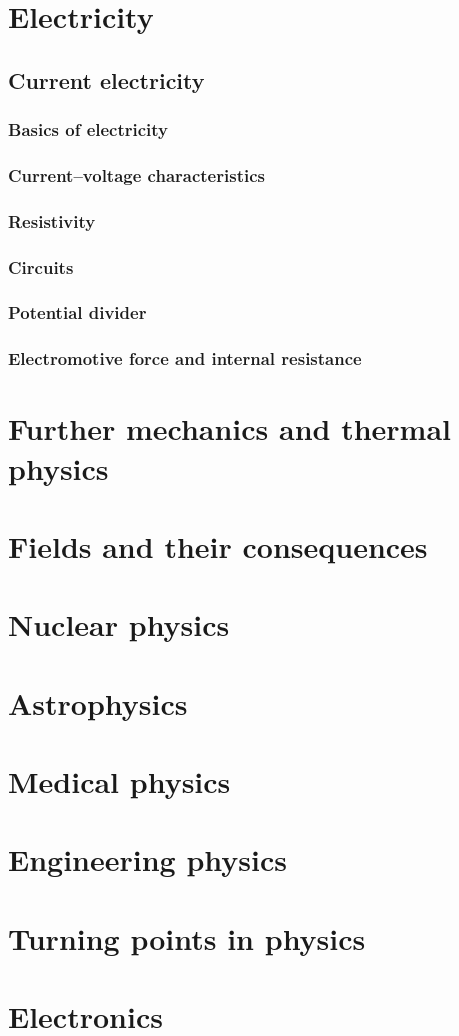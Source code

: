 \part{Electricity}
\chapter{Current electricity}
\section{Basics of electricity}
\section{Current–voltage characteristics}
\section{Resistivity}
\section{Circuits}
\section{Potential divider}
\section{Electromotive force and internal resistance}


\part{Further mechanics and thermal physics}
\part{Fields and their consequences}
\part{Nuclear physics}
\part{Astrophysics}
\part{Medical physics}
\part{Engineering physics}
\part{Turning points in physics}
\part{Electronics}
